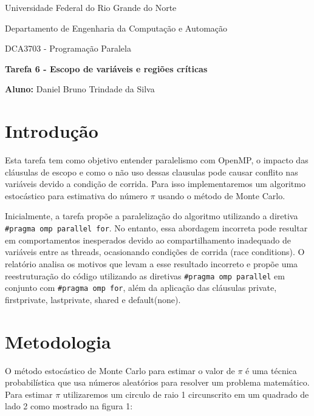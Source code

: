 \documentclass[a4paper, 12pt]{article}
\begin{document}
	\begin{center}
		Universidade Federal do Rio Grande do Norte
		
		Departamento de Engenharia da Computação e Automação
		
		DCA3703 - Programação Paralela
		
		\textbf{Tarefa 6 - Escopo de variáveis e regiões críticas}
		
		\textbf{Aluno:} Daniel Bruno Trindade da Silva
	\end{center}
	
	\section{Introdução}
	\hspace{.7cm}Esta tarefa tem como objetivo entender paralelismo com OpenMP, o impacto das cláusulas de escopo e como o não uso dessas clausulas pode causar conflito nas variáveis devido a condição de corrida. Para isso implementaremos um algoritmo estocástico para estimativa do número $\pi$ usando o método de Monte Carlo.
	
	Inicialmente, a tarefa propõe a paralelização do algoritmo utilizando a diretiva \texttt{\#pragma omp parallel for}. No entanto, essa abordagem incorreta pode resultar em comportamentos inesperados devido ao compartilhamento inadequado de variáveis entre as threads, ocasionando condições de corrida (race conditions). O relatório analisa os motivos que levam a esse resultado incorreto e propõe uma reestruturação do código utilizando as diretivas \texttt{\#pragma omp parallel} em conjunto com \texttt{\#pragma omp for}, além da aplicação das cláusulas private, firstprivate, lastprivate, shared e default(none).
	
	\section{Metodologia}
	\hspace{.7cm}O método estocástico de Monte Carlo para estimar o valor de $\pi$ é uma técnica probabilística que usa números aleatórios para resolver um problema matemático. Para estimar $\pi$ utilizaremos um circulo de raio 1 circunscrito em um quadrado de lado 2 como mostrado na figura 1: 
	
\end{document}
